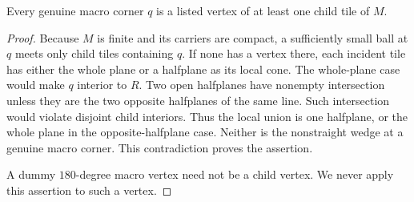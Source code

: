 \begin{lemma}
\label{lem:macrocorner}
Every genuine macro corner $q$ is a listed vertex of at least one child
tile of $M$.
\end{lemma}
\begin{proof}
Because $M$ is finite and its carriers are compact, a sufficiently small
ball at $q$ meets only child tiles containing $q$.  If none has a vertex
there, each incident tile has either the whole plane or a halfplane as
its local cone.  The whole-plane case would make $q$ interior to $R$.
Two open halfplanes have nonempty intersection unless they are the two
opposite halfplanes of the same line.  Such intersection would violate
disjoint child interiors.  Thus the local union is one halfplane, or the
whole plane in the opposite-halfplane case.  Neither is the nonstraight
wedge at a genuine macro corner.  This contradiction proves the assertion.

A dummy $180$-degree macro vertex need not be a child vertex.  We never
apply this assertion to such a vertex.
\end{proof}

